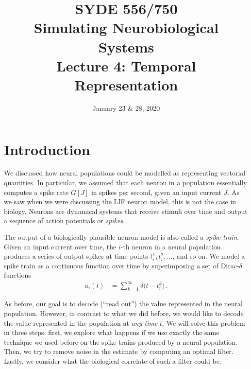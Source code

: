 \documentclass[10pt,letterpaper,oneside]{article}
\date{January 23 \& 28, 2020}
\title{SYDE 556/750 \\ Simulating Neurobiological Systems \\ Lecture 4: Temporal Representation}
\begin{document}

\section{Introduction}


We discussed how neural populations could be modelled as representing vectorial quantities. In particular, we assumed that each neuron in a population essentially computes a spike rate $G[J]$ in spikes per second, given an input current $J$. As we saw when we were discussing the LIF neuron model, this is not the case in biology. Neurons are dynamical systems that receive stimuli over time and output a sequence of action potentials or \emph{spikes}.

The output of a biologically plausible neuron model is also called a \emph{spike train}. Given an input current over time, the $i$-th neuron in a neural population produces a series of output spikes at time points $t^1_i, t^2_i, \ldots$, and so on. We model a spike train as a continuous function over time by superimposing a set of Dirac-$\delta$ functions
\begin{align*}
	a_i(t) &= \sum_{k = 1}^\infty \delta\big(t - t^k_i\big) \,.
\end{align*}


As before, our goal is to decode (\enquote{read out}) the value represented in the neural population. However, in contrast to what we did before, we would like to decode the value represented in the population at \emph{any time} $t$. We will solve this problem in three steps: first, we explore what happens if we use exactly the same technique we used before on the spike trains produced by a neural population. Then, we try to remove noise in the estimate by computing an optimal filter. Lastly, we consider what the biological correlate of such a filter could be.
\end{document}
